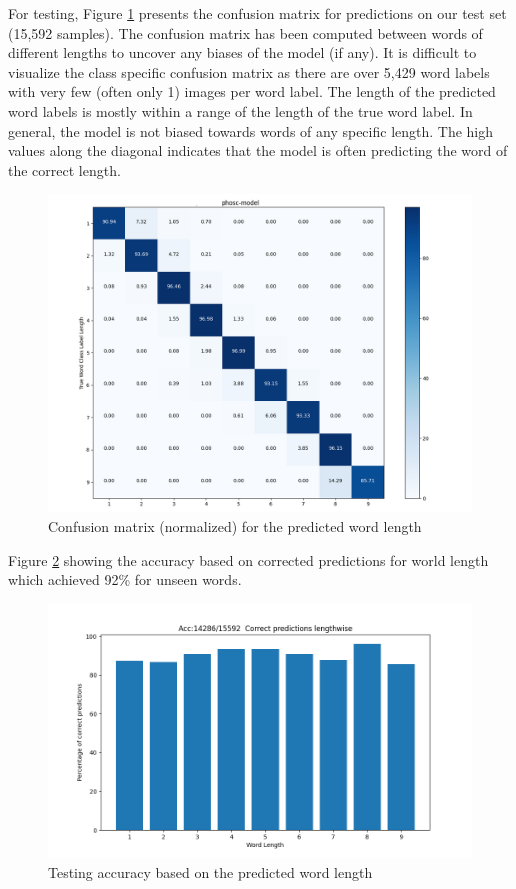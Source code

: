 For testing, Figure \ref{fig:confusion-matrix} presents the confusion matrix for predictions on our test set (15,592 samples). The confusion matrix has been computed between words of different lengths to uncover any biases of the model (if any). It is difficult to visualize the class specific confusion matrix as there are over 5,429 word labels with very few (often only 1) images per word label. The length of the predicted word labels is mostly within a range of the length of the true word label. In general, the model is not biased towards words of any specific length. The high values along the diagonal indicates that the model is often predicting the word of the correct length.

\begin{figure}[H]
    \centering
    \includegraphics[width=12cm]{images/confusion-matrix.png}
    \caption{Confusion matrix (normalized) for the predicted word length}
    \label{fig:confusion-matrix}
\end{figure}

Figure \ref{fig:test-accuracy} showing the accuracy based on corrected predictions for world length which achieved 92\% for unseen words.

\begin{figure}[H]
    \centering
    \includegraphics[width=12cm]{images/test-accuracy.png}
    \caption{Testing accuracy based on the predicted word length}
    \label{fig:test-accuracy}
\end{figure}

